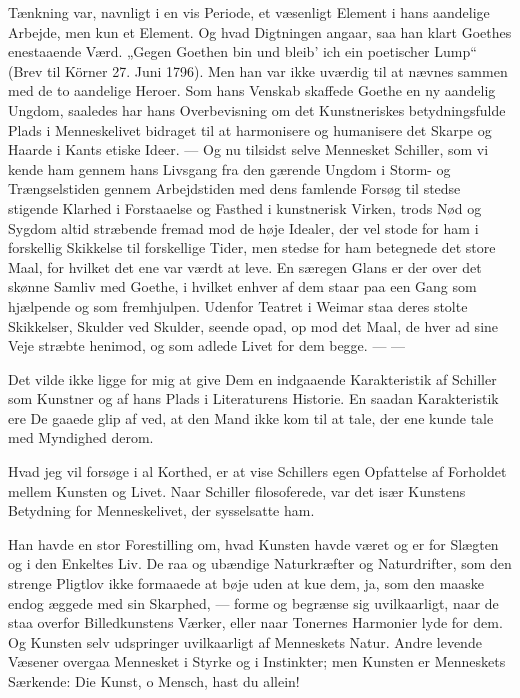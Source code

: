 \documentclass[12pt,a4paper,openany]{book}
\newcommand{\opage}[1]{\marginnote{\footnotesize\textit{[#1]}}}
\begin{document}
Tænkning var, navnligt i en vis Periode, et væsenligt Element
i hans aandelige Arbejde, men kun et Element. Og hvad
Digtningen angaar, saa han klart Goethes enestaaende Værd.
„Gegen Goethen bin und bleib’ ich ein poetischer Lump“ (Brev
til Körner 27. Juni 1796). Men han var ikke uværdig til at
nævnes sammen med de to aandelige Heroer. Som hans Venskab
skaffede Goethe en ny aandelig Ungdom, saaledes har
hans Overbevisning om det Kunstneriskes betydningsfulde Plads
i Menneskelivet bidraget til at harmonisere og humanisere det
Skarpe og Haarde i Kants etiske Ideer. --- Og nu tilsidst selve
Mennesket Schiller, som vi kende ham gennem hans Livsgang
fra den gærende Ungdom i Storm- og Trængselstiden gennem
Arbejdstiden med dens famlende Forsøg til stedse stigende
Klarhed i Forstaaelse og Fasthed i kunstnerisk Virken, trods
Nød og Sygdom altid stræbende fremad mod de høje Idealer,
der vel stode for ham i forskellig Skikkelse til forskellige Tider,
men stedse for ham betegnede det store Maal, for hvilket det
ene var værdt at leve. En særegen Glans er der over det
skønne Samliv med Goethe, i hvilket enhver af dem staar paa
een Gang som hjælpende og som fremhjulpen. Udenfor Teatret
i Weimar staa deres stolte Skikkelser, Skulder ved Skulder,
seende opad, op mod det Maal, de hver ad sine Veje stræbte
henimod, og som adlede Livet for dem begge. --- ---

Det vilde ikke ligge for mig at give Dem en indgaaende
Karakteristik af Schiller som Kunstner og af hans Plads i Literaturens
Historie. En saadan Karakteristik ere De gaaede glip
af ved, at den Mand ikke kom til at tale, der ene kunde tale
med Myndighed derom.

Hvad jeg vil forsøge i al Korthed, er at vise Schillers egen
\setcounter{footnote}{0}%
\opage{178}Opfattelse af Forholdet mellem Kunsten og Livet. Naar Schiller
filosoferede, var det især Kunstens Betydning for Menneskelivet,
der sysselsatte ham.

Han havde en stor Forestilling om, hvad Kunsten havde
været og er for Slægten og i den Enkeltes Liv. De raa og
ubændige Naturkræfter og Naturdrifter, som den strenge Pligtlov
ikke formaaede at bøje uden at kue dem, ja, som den
maaske endog æggede med sin Skarphed, --- forme og begrænse
sig uvilkaarligt, naar de staa overfor Billedkunstens Værker,
eller naar Tonernes Harmonier lyde for dem. Og Kunsten selv
udspringer uvilkaarligt af Menneskets Natur. Andre levende
Væsener overgaa Mennesket i Styrke og i Instinkter; men
Kunsten er Menneskets Særkende:
Die Kunst, o Mensch, hast du allein!
\end{document}
